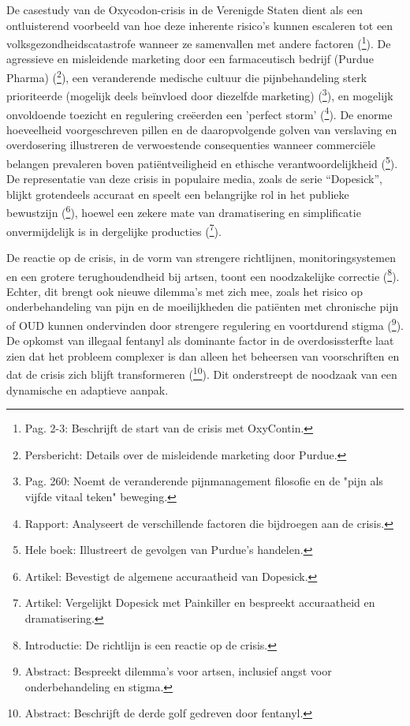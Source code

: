 \documentclass[11pt, a4paper]{report} %
\begin{document}
De casestudy van de Oxycodon-crisis in de Verenigde Staten dient als een ontluisterend voorbeeld van hoe deze inherente risico's kunnen escaleren tot een volksgezondheidscatastrofe wanneer ze samenvallen met andere factoren (\cite{Maclean2020EconomicStudiesOpioid}\footnote{Pag. 2-3: Beschrijft de start van de crisis met OxyContin.}). De agressieve en misleidende marketing door een farmaceutisch bedrijf (Purdue Pharma) (\cite{JusticeDeptPurdueResolution}\footnote{Persbericht: Details over de misleidende marketing door Purdue.}), een veranderende medische cultuur die pijnbehandeling sterk prioriteerde (mogelijk deels beïnvloed door diezelfde marketing) (\cite{Cicero2017Review}\footnote{Pag. 260: Noemt de veranderende pijnmanagement filosofie en de "pijn als vijfde vitaal teken" beweging.}), en mogelijk onvoldoende toezicht en regulering creëerden een 'perfect storm' (\cite{CRS2022OpioidCrisisHistory}\footnote{Rapport: Analyseert de verschillende factoren die bijdroegen aan de crisis.}). De enorme hoeveelheid voorgeschreven pillen en de daaropvolgende golven van verslaving en overdosering illustreren de verwoestende consequenties wanneer commerciële belangen prevaleren boven patiëntveiligheid en ethische verantwoordelijkheid (\cite{Macy2018Dopesick}\footnote{Hele boek: Illustreert de gevolgen van Purdue's handelen.}). De representatie van deze crisis in populaire media, zoals de serie \enquote{Dopesick}, blijkt grotendeels accuraat en speelt een belangrijke rol in het publieke bewustzijn (\cite{AvenuesRecoveryDopesickTrue}\footnote{Artikel: Bevestigt de algemene accuraatheid van Dopesick.}), hoewel een zekere mate van dramatisering en simplificatie onvermijdelijk is in dergelijke producties (\cite{ScreenrantPainkillerVsDopesick}\footnote{Artikel: Vergelijkt Dopesick met Painkiller en bespreekt accuraatheid en dramatisering.}).

De reactie op de crisis, in de vorm van strengere richtlijnen, monitoringsystemen en een grotere terughoudendheid bij artsen, toont een noodzakelijke correctie (\cite{Dowell2016CDCGuideline}\footnote{Introductie: De richtlijn is een reactie op de crisis.}). Echter, dit brengt ook nieuwe dilemma's met zich mee, zoals het risico op onderbehandeling van pijn en de moeilijkheden die patiënten met chronische pijn of OUD kunnen ondervinden door strengere regulering en voortdurend stigma (\cite{Norman2022GPAttitudes}\footnote{Abstract: Bespreekt dilemma's voor artsen, inclusief angst voor onderbehandeling en stigma.}). De opkomst van illegaal fentanyl als dominante factor in de overdosissterfte laat zien dat het probleem complexer is dan alleen het beheersen van voorschriften en dat de crisis zich blijft transformeren (\cite{Ciccarone2019TripleWave}\footnote{Abstract: Beschrijft de derde golf gedreven door fentanyl.}). Dit onderstreept de noodzaak van een dynamische en adaptieve aanpak.
\end{document}
